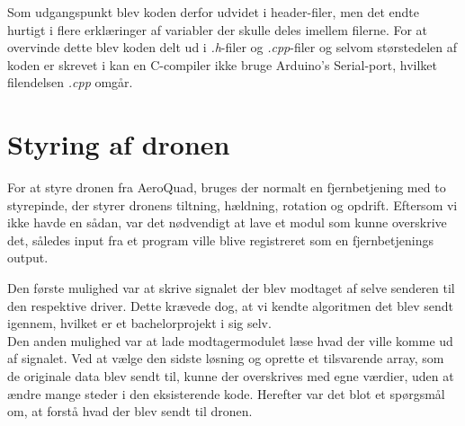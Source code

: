\documentclass[Main]{subfiles}
\begin{document}
Som udgangspunkt blev koden derfor udvidet i header-filer, men det endte hurtigt i flere erklæringer af variabler der skulle deles imellem filerne. 
For at overvinde dette blev koden delt ud i \textit{.h}-filer og \textit{.cpp}-filer og selvom størstedelen af koden er skrevet i  kan en C-compiler ikke bruge Arduino's Serial-port, hvilket filendelsen \textit{.cpp} omgår.



\section{Styring af dronen}
For at styre dronen fra AeroQuad, bruges der normalt en fjernbetjening med to styrepinde, der styrer dronens tiltning, hældning, rotation og opdrift.
Eftersom vi ikke havde en sådan, var det nødvendigt at lave et modul som kunne overskrive det, således input fra et program ville blive registreret som en fjernbetjenings output.


Den første mulighed var at skrive signalet der blev modtaget af selve senderen til den respektive driver. 
Dette krævede dog, at vi kendte algoritmen det blev sendt igennem, hvilket er et bachelorprojekt i sig selv.
\\
Den anden mulighed var at lade modtagermodulet læse hvad der ville komme ud af signalet.
Ved at vælge den sidste løsning og oprette et tilsvarende array, som de originale data blev sendt til, kunne der overskrives med egne værdier, uden at ændre mange steder i den eksisterende kode.
Herefter var det blot et spørgsmål om, at forstå hvad der blev sendt til dronen.
\end{document}
